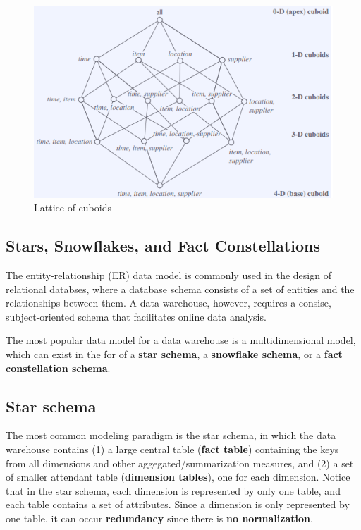 		\begin{figure}[H]
			\centering
			\includegraphics[scale=0.5]{pics/latticecuboid.png}
			\caption{Lattice of cuboids}
		\end{figure}

	\subsection{Stars, Snowflakes, and Fact Constellations}

		The entity-relationship (ER) data model is commonly used in the design of relational
		databses, where a database schema consists of a set of entities and the relationships
		between them.
		A data warehouse, however, requires a consise, subject-oriented schema that facilitates
		online data analysis. 

		The most popular data model for a data warehouse is a multidimensional model,
		which can exist in the for of a {\bf star schema}, a {\bf snowflake schema}, or
		a {\bf fact constellation schema}. 

		\subsection*{Star schema} 

		The most common modeling paradigm is the star schema, in which
		the data warehouse contains (1) a large central table ({\bf fact table}) containing
		the keys from all dimensions and other aggegated/summarization measures, and (2)
		a set of smaller attendant table ({\bf dimension tables}), one for each dimension.
		Notice that in the star schema, each dimension is represented by only one table, and
		each table contains a set of attributes. Since a dimension is only represented by one
		table, it can occur {\bf redundancy} since there is {\bf no normalization}. 

